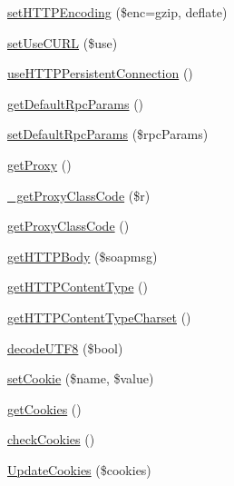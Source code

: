 \begin{DoxyCompactItemize}
\item 
\hyperlink{classnusoap__client_a9528927202777242800c394fadc03191}{set\+H\+T\+T\+P\+Encoding} (\$enc=\textquotesingle{}gzip, deflate\textquotesingle{})
\item 
\hyperlink{classnusoap__client_ae0907a30339d32d93ebc4ba9c436d4de}{set\+Use\+C\+U\+R\+L} (\$use)
\item 
\hyperlink{classnusoap__client_a6558d144faf99ccc9ef4621ffd56bd75}{use\+H\+T\+T\+P\+Persistent\+Connection} ()
\item 
\hyperlink{classnusoap__client_a95ae30619429aa7d1c93f21e33300419}{get\+Default\+Rpc\+Params} ()
\item 
\hyperlink{classnusoap__client_a9d7b3609d1db3eb5f2d3cf92510e4e6b}{set\+Default\+Rpc\+Params} (\$rpc\+Params)
\item 
\hyperlink{classnusoap__client_a839ac5be1fce2af15c73aef02a49a8af}{get\+Proxy} ()
\item 
\hyperlink{classnusoap__client_a2b49882c792a4deb80ec35ca75f1fee6}{\+\_\+get\+Proxy\+Class\+Code} (\$r)
\item 
\hyperlink{classnusoap__client_a5fbf58b6ba27a02544885d4fc801d328}{get\+Proxy\+Class\+Code} ()
\item 
\hyperlink{classnusoap__client_ab1e22b0858bdbe61d2d711ff442c0e78}{get\+H\+T\+T\+P\+Body} (\$soapmsg)
\item 
\hyperlink{classnusoap__client_a2bed19ef2d537dee244535339cd6026a}{get\+H\+T\+T\+P\+Content\+Type} ()
\item 
\hyperlink{classnusoap__client_a9051db33a9b7e50315d9222ef1c52ce9}{get\+H\+T\+T\+P\+Content\+Type\+Charset} ()
\item 
\hyperlink{classnusoap__client_a8ebcfd008049181e64a5046eb8c168b9}{decode\+U\+T\+F8} (\$bool)
\item 
\hyperlink{classnusoap__client_a3f05f631ff936a033cae038052d9e7f9}{set\+Cookie} (\$name, \$value)
\item 
\hyperlink{classnusoap__client_a374b645410526cbbb498b140242a00ba}{get\+Cookies} ()
\item 
\hyperlink{classnusoap__client_a6a8794beffec4a05daa7559ab233875e}{check\+Cookies} ()
\item 
\hyperlink{classnusoap__client_ad71447ce0ee50309eea6ce0e12a88e02}{Update\+Cookies} (\$cookies)
\end{DoxyCompactItemize}
